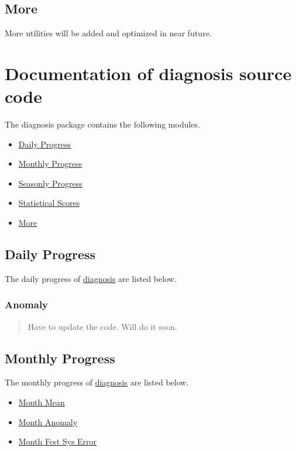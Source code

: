 \documentclass[letterpaper,10pt,english]{sphinxmanual}
\begin{document}
\section{More}
\label{diagnosisutils:more}
More utilities will be added and optimized in near future.


\chapter{Documentation of \textbf{diagnosis} source code}
\label{diagnosis:documentation-of-diagnosis-source-code}\label{diagnosis::doc}\label{diagnosis:diagnosis}
The diagnosis package contains the following modules.
\begin{itemize}
\item {} 
{\hyperref[diagnosis:daily-progress]{Daily Progress}}

\item {} 
{\hyperref[diagnosis:monthly-progress]{Monthly Progress}}

\item {} 
{\hyperref[diagnosis:seasonly-progress]{Seasonly Progress}}

\item {} 
{\hyperref[diagnosis:statistical-scores]{Statistical Scores}}

\item {} 
{\hyperref[diagnosis:more]{More}}

\end{itemize}


\section{Daily Progress}
\label{diagnosis:daily-progress}
The daily progress of {\hyperref[diagnosis:diagnosis]{diagnosis}} are listed below.


\subsection{Anomaly}
\label{diagnosis:anomaly}\begin{quote}

Have to update the code. Will do it soon.
\end{quote}


\section{Monthly Progress}
\label{diagnosis:monthly-progress}
The monthly progress of {\hyperref[diagnosis:diagnosis]{diagnosis}} are listed below.
\begin{itemize}
\item {} 
{\hyperref[diagnosis:month-mean]{Month Mean}}

\item {} 
{\hyperref[diagnosis:month-anomaly]{Month Anomaly}}

\item {} 
{\hyperref[diagnosis:month-fcst-sys-error]{Month Fcst Sys Error}}

\end{itemize}
\end{document}
